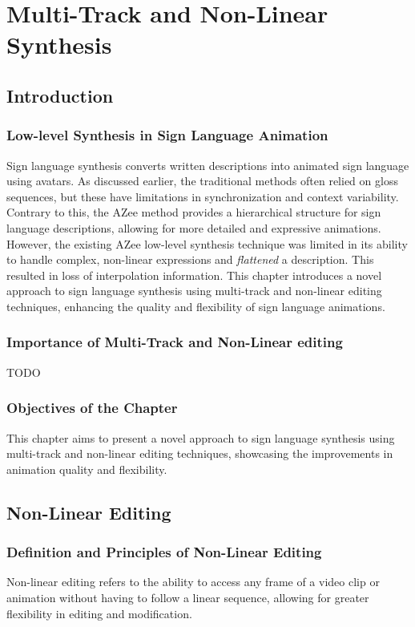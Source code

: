 \documentclass[../../main.tex]{subfiles}
\begin{document}
\chapter{Multi-Track and Non-Linear Synthesis}

\section{Introduction}
\subsection{Low-level Synthesis in Sign Language Animation}
Sign language synthesis converts written descriptions into animated sign language using avatars. As discussed earlier, the traditional methods often relied on gloss sequences, but these have limitations in synchronization and context variability. Contrary  to this, the AZee method provides a hierarchical structure for sign language descriptions, allowing for more detailed and expressive animations. However, the existing AZee low-level synthesis technique was limited in its ability to handle complex, non-linear expressions and \emph{flattened} a description. This resulted in loss of interpolation information. This chapter introduces a novel approach to sign language synthesis using multi-track and non-linear editing techniques, enhancing the quality and flexibility of sign language animations.

\subsection{Importance of Multi-Track and Non-Linear editing}
TODO

\subsection{Objectives of the Chapter}
This chapter aims to present a novel approach to sign language synthesis using multi-track and non-linear editing techniques, showcasing the improvements in animation quality and flexibility.

\section{Non-Linear Editing}
\subsection{Definition and Principles of Non-Linear Editing}
Non-linear editing refers to the ability to access any frame of a video clip or animation without having to follow a linear sequence, allowing for greater flexibility in editing and modification.
\end{document}
